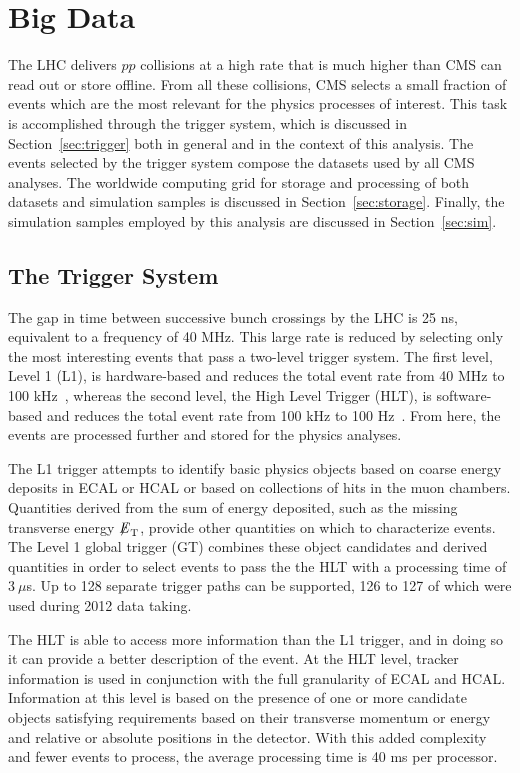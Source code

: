 \chapter{Big Data\label{ch:data}}

The LHC delivers $pp$ collisions at a high rate that is much higher than CMS can read out or store
offline. From all these collisions, CMS selects a small fraction of events
which are the most relevant for the physics processes of interest. This task is accomplished
through the trigger system, which is discussed in Section~\ref{sec:trigger} both in general and
in the context of this analysis. The events selected by the trigger system compose the datasets
used by all CMS analyses. The worldwide computing grid for storage and processing of both datasets
and simulation samples is discussed in Section~\ref{sec:storage}. Finally, the simulation samples
employed by this analysis are discussed in Section~\ref{sec:sim}.


\section{The Trigger System\label{sec:trigger}}

The gap in time between successive bunch crossings by the LHC is 25 ns, equivalent to
a frequency of 40 MHz. This large rate is reduced by selecting only the most interesting events
that pass a two-level trigger system. The first level, Level 1 (L1), is hardware-based and reduces the
total event rate from 40 MHz to 100 kHz~\cite{Bayatyan:706847}, whereas the second level,
the High Level Trigger (HLT), is software-based and reduces the total event rate from 100 kHz to
100 Hz~\cite{Virdee:1043242}. From here, the events are processed further and stored
for the physics analyses.

The L1 trigger attempts to identify basic physics objects based on coarse energy deposits in
ECAL or HCAL or
based on collections of hits in the muon chambers.
Quantities derived from the sum of energy deposited, such as the missing transverse energy ${\not\mathrel{E}}_{\text{T}}$,
provide other quantities on which to characterize events.
The Level 1 global trigger (GT) combines these object candidates and derived quantities in order
to select events to pass the the HLT with a processing time of $3~\mu$s.
Up to 128 separate trigger paths can be supported, 126 to 127 of which were used during 2012
data taking. %

The HLT is able to access more information than the L1 trigger, and in doing so it can provide
a better description of the event. At the HLT level, tracker information is used in conjunction with
the full granularity of ECAL and HCAL. Information at this level is based on the presence of one or
more candidate objects satisfying requirements based on their transverse momentum or energy and relative
or absolute positions in the detector. With this added complexity and fewer events to process,
the average processing time is 40 ms per processor.


